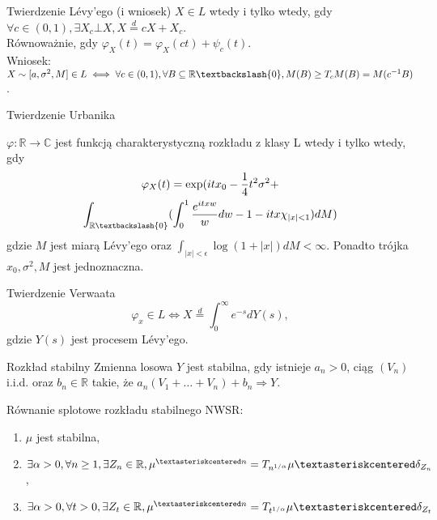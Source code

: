 \documentclass[avery5371, grid, frame]{flashcards}
\begin{document}
\begin{flashcard}[Twierdzenie]{Twierdzenie L\'evy'ego (i wniosek)}
    $X \in L$ wtedy i tylko wtedy, gdy $\forall c \in (0, 1), \exists X_c \bot X, X \overset{d}{=} cX + X_c$. \\
    Równoważnie, gdy $\varphi_X(t) = \varphi_X(ct) + \psi_c(t)$. \\
    Wniosek: $X \sim [a, \sigma^2, M] \in L \iff \forall c \in (0, 1), \forall B \subseteq \mathbb{R} \textbackslash \{0\}, M(B) \geq T_c M(B) = M(c^{-1} B)$.
\end{flashcard}

\begin{flashcard}[Twierdzenie]{Twierdzenie Urbanika}
\begin{small}
    $\varphi : \mathbb{R} \rightarrow \mathbb{C}$ jest funkcją charakterystyczną rozkładu z klasy L wtedy i tylko wtedy, gdy
    \begin{multline*}
        \varphi_X(t) = \exp (itx_0 - \frac{1}{4}t^2\sigma^2 + \\ \int_{\mathbb{R} \textbackslash \{ 0 \}} (\int_0^1 \frac{e^{itxw}}{w}dw - 1 - itx \chi_{|x|<1}) dM)
    \end{multline*}
    gdzie $M$ jest miarą L\'evy'ego oraz $\int_{|x| < \epsilon} \log(1+|x|)dM < \infty$. Ponadto trójka $x_0, \sigma^2, M$ jest jednoznaczna.
\end{small}
\end{flashcard}

\begin{flashcard}[Twierdzenie]{Twierdzenie Verwaata}
    $$\varphi_x \in L
    \iff X \overset{d}{=} \int_0^\infty e^{-s} dY(s),$$
    gdzie $Y(s)$ jest procesem L\'evy'ego.
\end{flashcard}

\begin{flashcard}[Definicja]{Rozkład stabilny}
    Zmienna losowa $Y$ jest stabilna, gdy istnieje $a_n > 0$, ciąg $(V_n)$ i.i.d. oraz $b_n \in \mathbb{R}$ takie, że $a_n(V_1 + \dots + V_n) + b_n \Rightarrow Y$.
\end{flashcard}

\begin{flashcard}[Twierdznie]{Równanie splotowe rozkładu stabilnego}
    NWSR:
    \begin{enumerate}
        \item $\mu$ jest stabilna,
        \item $\exists \alpha > 0, \forall n \geq 1, \exists Z_n \in \mathbb{R}, \mu^{\textasteriskcentered n} = T_{n^{1/\alpha}} \mu \textasteriskcentered \delta_{Z_n}$,
        \item $\exists \alpha > 0, \forall t > 0, \exists Z_t \in \mathbb{R}, \mu^{\textasteriskcentered n} = T_{t^{1/\alpha}} \mu \textasteriskcentered \delta_{Z_t}$
    \end{enumerate}
\end{flashcard}
\end{document}
